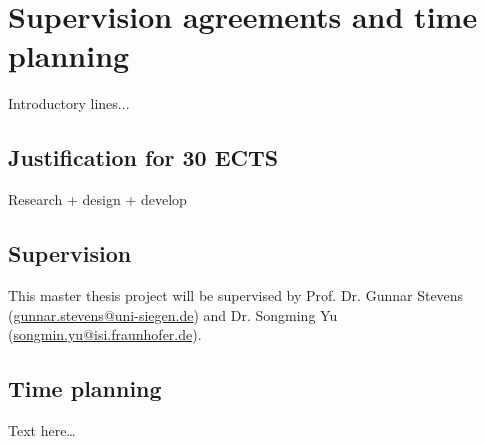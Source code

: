 \chapter{Supervision agreements and time planning} 

Introductory lines...

\section{Justification for 30 ECTS}

Research + design + develop

\section{Supervision}

This master thesis project will be supervised by 
Prof. Dr. Gunnar Stevens (\href{mailto:gunnar.stevens@uni-siegen.de}{gunnar.stevens@uni-siegen.de}) and 
Dr. Songming Yu (\href{mailto:songmin.yu@isi.fraunhofer.de}{songmin.yu@isi.fraunhofer.de}).  

\section{Time planning}

Text here\dots